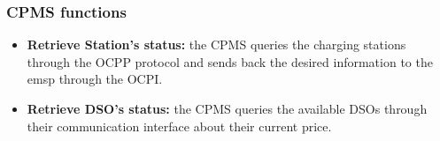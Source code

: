 \documentclass[table, 12pt]{article} %
\begin{document}
    \newpage
        \subsubsection{CPMS functions}
        \begin{itemize}                                 
            \item \textbf{Retrieve Station's status:} the CPMS queries the charging stations through the OCPP protocol and sends back the desired information to the emsp through the OCPI.
        \end{itemize}

        \begin{itemize}                                 
            \item \textbf{Retrieve DSO's status:} the CPMS queries the available DSOs through their communication interface about their current price.
        \end{itemize}
\end{document}
